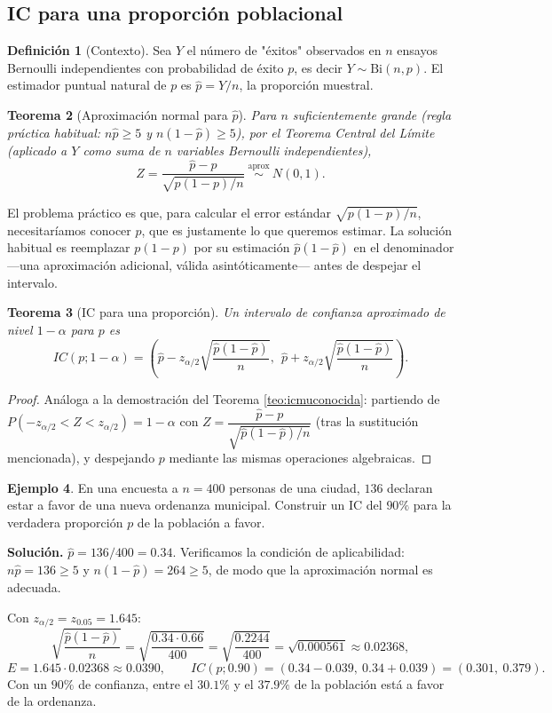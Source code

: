 \documentclass[11pt,a4paper]{article}
\theoremstyle{plain}
\newtheorem{teorema}{Teorema}[section]
\theoremstyle{definition}
\newtheorem{definicion}[teorema]{Definición}
\newtheorem{ejemplo}[teorema]{Ejemplo}
\theoremstyle{remark}
\begin{document}
\subsection{IC para una proporción poblacional}

\begin{definicion}[Contexto]
Sea $Y$ el número de "éxitos" observados en $n$ ensayos Bernoulli independientes con probabilidad de éxito $p$, es decir $Y\sim\text{Bi}(n,p)$. El estimador puntual natural de $p$ es $\widehat p=Y/n$, la proporción muestral.
\end{definicion}

\begin{teorema}[Aproximación normal para $\widehat p$]
Para $n$ suficientemente grande (regla práctica habitual: $n\widehat p\ge 5$ y $n(1-\widehat p)\ge 5$), por el Teorema Central del Límite (aplicado a $Y$ como suma de $n$ variables Bernoulli independientes),
\[
Z = \frac{\widehat p-p}{\sqrt{p(1-p)/n}} \ \overset{\text{aprox}}{\sim}\ N(0,1).
\]
\end{teorema}

El problema práctico es que, para calcular el error estándar $\sqrt{p(1-p)/n}$, necesitaríamos conocer $p$, que es justamente lo que queremos estimar. La solución habitual es reemplazar $p(1-p)$ por su estimación $\widehat p(1-\widehat p)$ en el denominador —una aproximación adicional, válida asintóticamente— antes de despejar el intervalo.

\begin{teorema}[IC para una proporción]
Un intervalo de confianza aproximado de nivel $1-\alpha$ para $p$ es
\[
IC(p;1-\alpha) = \left(\widehat p - z_{\alpha/2}\sqrt{\frac{\widehat p(1-\widehat p)}{n}},\ \ \widehat p+z_{\alpha/2}\sqrt{\frac{\widehat p(1-\widehat p)}{n}}\right).
\]
\end{teorema}

\begin{proof}
Análoga a la demostración del Teorema \ref{teo:icmuconocida}: partiendo de $P(-z_{\alpha/2}<Z<z_{\alpha/2})=1-\alpha$ con $Z=\dfrac{\widehat p-p}{\sqrt{\widehat p(1-\widehat p)/n}}$ (tras la sustitución mencionada), y despejando $p$ mediante las mismas operaciones algebraicas.
\end{proof}

\begin{ejemplo}
En una encuesta a $n=400$ personas de una ciudad, $136$ declaran estar a favor de una nueva ordenanza municipal. Construir un IC del $90\%$ para la verdadera proporción $p$ de la población a favor.

\textbf{Solución.} $\widehat p = 136/400=0.34$. Verificamos la condición de aplicabilidad: $n\widehat p=136\ge 5$ y $n(1-\widehat p)=264\ge 5$, de modo que la aproximación normal es adecuada.

Con $z_{\alpha/2}=z_{0.05}=1.645$:
\[
\sqrt{\frac{\widehat p(1-\widehat p)}{n}} = \sqrt{\frac{0.34\cdot 0.66}{400}} = \sqrt{\frac{0.2244}{400}} = \sqrt{0.000561}\approx 0.02368,
\]
\[
E = 1.645\cdot 0.02368 \approx 0.0390, \qquad IC(p;0.90) = (0.34-0.039,\ 0.34+0.039) = (0.301,\ 0.379).
\]
Con un $90\%$ de confianza, entre el $30.1\%$ y el $37.9\%$ de la población está a favor de la ordenanza.
\end{ejemplo}
\end{document}
